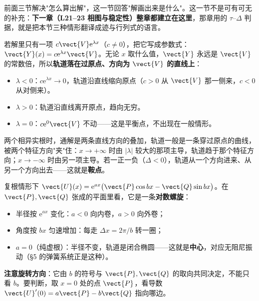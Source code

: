 \documentclass[11pt]{ctexart}
\begin{document}

前面三节解决"怎么算出解"，这一节回答"解画出来是什么"。这一节不是可有可无的补充：\textbf{下一章（L21--23 相图与稳定性）整章都建立在这里}，那章用的 $\tau$--$\Delta$ 判据，就是把本节三种情形翻译成迹与行列式的语言。


若解里只有一项 $c\vect{V}\mathrm{e}^{\lambda x}$（$c\neq0$），把它写成参数式：$\vect{Y}(x)=c\mathrm{e}^{\lambda x}\vect{V}$。无论 $x$ 取什么值，$\vect{Y}$ 永远是 $\vect{V}$ 的常数倍，所以\textbf{轨道落在过原点、方向为 $\vect{V}$ 的直线上}：

\begin{itemize}
  \item $\lambda<0$：$c\mathrm{e}^{\lambda x}\to0$，轨道沿直线缩向原点（$c>0$ 从 $\vect{V}$ 那一侧来，$c<0$ 从对侧来）。
  \item $\lambda>0$：轨道沿直线离开原点，趋向无穷。
  \item $\lambda=0$：$c\mathrm{e}^{0}\vect{V}$ 不动——这是平衡点，不出现在一般情形。
\end{itemize}

两个相异实根时，通解是两条直线方向的叠加，轨道一般是一条穿过原点的曲线，被两个特征方向"夹"住：$x\to+\infty$ 时由 $|\lambda|$ 较大的那项主导，轨道趋于那个特征方向；$x\to-\infty$ 时由另一项主导。若一正一负（$\Delta<0$），轨道从一个方向进来、从另一个方向出去——这就是\textbf{鞍点}。


复根情形下 $\vect{U}(x)=\mathrm{e}^{ax}\bigl(\vect{P}\cos bx-\vect{Q}\sin bx\bigr)$。在 $\vect{P},\vect{Q}$ 张成的平面里看，它是一条\textbf{对数螺旋}：

\begin{itemize}
  \item 半径按 $\mathrm{e}^{ax}$ 变化：$a<0$ 向内卷，$a>0$ 向外卷；
  \item 角度按 $bx$ 匀速增加：每走 $\Delta x=2\pi/b$ 转一圈；
  \item $a=0$（纯虚根）：半径不变，轨道是闭合椭圆——这就是\textbf{中心}，对应无阻尼振动（§5 的弹簧系统正是这种）。
\end{itemize}

\textbf{注意旋转方向}：它由 $b$ 的符号与 $\vect{P},\vect{Q}$ 的取向共同决定，不能只看 $b$。要判断，取 $x=0$ 处的点 $\vect{P}$，看导数 $\vect{U}'(0)=a\vect{P}-b\vect{Q}$ 指向哪边。
\end{document}
